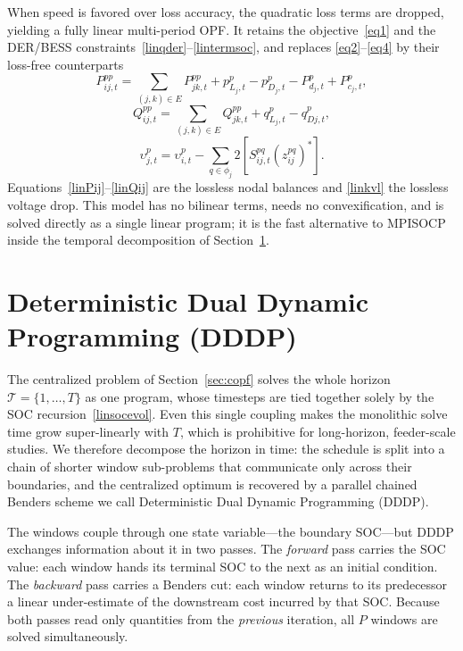 When speed is favored over loss accuracy, the quadratic loss terms are
dropped, yielding a fully linear multi-period OPF. It retains the
objective~\eqref{eq1} and the DER/BESS
constraints~\eqref{linqder}--\eqref{lintermsoc}, and replaces
\eqref{eq2}--\eqref{eq4} by their loss-free counterparts
\begin{equation}\label{linPij}
P_{ij,t}^{pp} = \sum_{(j,k)\in E} {P_{jk,t}^{pp}} + p_{{L_j,t}}^p - p_{D_j,t}^p - P_{d_j,t}^p + P_{c_j,t}^p,
\end{equation}
\begin{equation}\label{linQij}
Q_{ij,t}^{pp} = \sum_{(j,k)\in E} {Q_{jk,t}^{pp}} + q_{{L_j,t}}^p - q_{Dj,t}^p,
\end{equation}
\begin{equation}\label{linkvl}
{\upsilon }_{j,t}^p = {\upsilon}_{i,t}^p - \sum\limits_{q \in {\phi _j}} {2\left[ {S_{ij,t}^{pq}\left( {z_{ij}^{pq}} \right)^*} \right]}.
\end{equation}
Equations~\eqref{linPij}--\eqref{linQij} are the lossless nodal balances
and \eqref{linkvl} the lossless voltage drop. This model has no bilinear
terms, needs no convexification, and is solved directly as a single
linear program; it is the fast alternative to MPISOCP inside the
temporal decomposition of Section~\ref{sec:dddp}.

\section{Deterministic Dual Dynamic Programming (DDDP)}
\label{sec:dddp}

The centralized problem of Section~\ref{sec:copf} solves the whole
horizon $\mathcal{T}=\{1,\dots,T\}$ as one program, whose timesteps are
tied together solely by the SOC recursion~\eqref{linsocevol}. Even this
single coupling makes the monolithic solve time grow super-linearly with
$T$, which is prohibitive for long-horizon, feeder-scale studies. We
therefore decompose the horizon in time: the schedule is split into a
chain of shorter window sub-problems that communicate only across their
boundaries, and the centralized optimum is recovered by a parallel
chained Benders scheme we call Deterministic Dual Dynamic Programming
(DDDP).

The windows couple through one state variable---the boundary SOC---but
DDDP exchanges information about it in two passes. The \emph{forward}
pass carries the SOC value: each window hands its terminal SOC to the
next as an initial condition. The \emph{backward} pass carries a Benders
cut: each window returns to its predecessor a linear under-estimate of
the downstream cost incurred by that SOC. Because both passes read only
quantities from the \emph{previous} iteration, all $P$ windows are solved
simultaneously.

